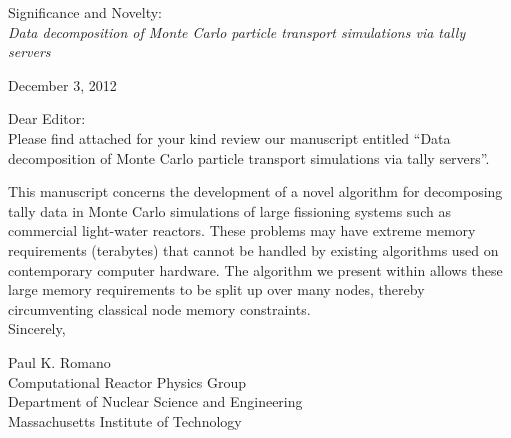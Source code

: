 \documentclass[12pt]{article}
\begin{document}
\begin{center}
  \large Significance and Novelty: \\ \emph{Data decomposition of Monte Carlo
    particle transport simulations via tally servers}
\end{center}
\vspace{30pt}

December 3, 2012
\vspace{30pt}

Dear Editor: \\

Please find attached for your kind review our manuscript entitled ``Data
decomposition of Monte Carlo particle transport simulations via tally servers''.

This manuscript concerns the development of a novel algorithm for decomposing
tally data in Monte Carlo simulations of large fissioning systems such as
commercial light-water reactors. These problems may have extreme memory
requirements (terabytes) that cannot be handled by existing algorithms used on
contemporary computer hardware. The algorithm we present within allows these
large memory requirements to be split up over many nodes, thereby circumventing
classical node memory constraints.\\

Sincerely,

Paul K. Romano \\
Computational Reactor Physics Group \\
Department of Nuclear Science and Engineering \\
Massachusetts Institute of Technology
\end{document}
